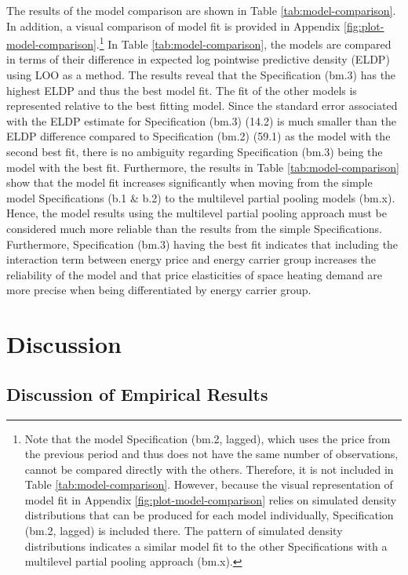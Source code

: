 \documentclass[12pt,twoside]{reedthesis}
\begin{document}
The results of the model comparison are shown in Table \ref{tab:model-comparison}. In addition, a visual comparison of model fit is provided in Appendix \ref{fig:plot-model-comparison}.\footnote{Note that the model Specification (bm.2, lagged), which uses the price from the previous period and thus does not have the same number of observations, cannot be compared directly with the others. Therefore, it is not included in Table \ref{tab:model-comparison}. However, because the visual representation of model fit in Appendix \ref{fig:plot-model-comparison} relies on simulated density distributions that can be produced for each model individually, Specification (bm.2, lagged) is included there. The pattern of simulated density distributions indicates a similar model fit to the other Specifications with a multilevel partial pooling approach (bm.x).} In Table \ref{tab:model-comparison}, the models are compared in terms of their difference in expected log pointwise predictive density (ELDP) using LOO as a method. The results reveal that the Specification (bm.3) has the highest ELDP and thus the best model fit. The fit of the other models is represented relative to the best fitting model. Since the standard error associated with the ELDP estimate for Specification (bm.3) (14.2) is much smaller than the ELDP difference compared to Specification (bm.2) (59.1) as the model with the second best fit, there is no ambiguity regarding Specification (bm.3) being the model with the best fit. Furthermore, the results in Table \ref{tab:model-comparison} show that the model fit increases significantly when moving from the simple model Specifications (b.1 \& b.2) to the multilevel partial pooling models (bm.x). Hence, the model results using the multilevel partial pooling approach must be considered much more reliable than the results from the simple Specifications. Furthermore, Specification (bm.3) having the best fit indicates that including the interaction term between energy price and energy carrier group increases the reliability of the model and that price elasticities of space heating demand are more precise when being differentiated by energy carrier group.

\hypertarget{discussion}{%
\chapter{Discussion}\label{discussion}}

\hypertarget{discussion-results}{%
\section{Discussion of Empirical Results}\label{discussion-results}}
\end{document}
